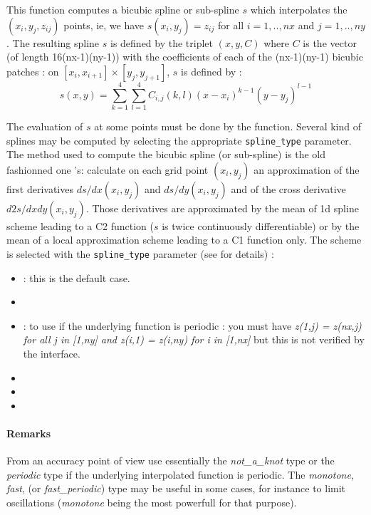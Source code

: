 \begin{mandescription}
    This function computes a bicubic spline or sub-spline $s$ which interpolates the 
    $(x_i,y_j,z_{ij})$ points, ie, we have $s(x_i,y_j)=z_{ij}$ for all  $i=1,..,nx$
    and $j=1,..,ny$. 
    The resulting spline $s$ is defined by the triplet $(x,y,C)$ where
    $C$ is the vector (of length 16(nx-1)(ny-1)) with the coefficients of each
    of the (nx-1)(ny-1) bicubic patches : on $[x_i, x_{i+1}] \times
    [y_j, y_{j+1}]$, $s$ is defined by :
    $$
       s(x,y) = \sum_{k=1}^4  \sum_{l=1}^4  C_{i,j}(k,l) (x - x_i)^{k-1}
       (y - y_j)^{l-1}
    $$

    The evaluation of  $s$ at some points must be done by the   
    function. Several kind of splines may be computed by selecting the appropriate 
    \verb!spline_type! parameter. The method used to compute the bicubic spline
    (or sub-spline) is the old fashionned one 's: calculate on each grid point
    $(x_i,y_j)$ an approximation of the first derivatives $ds/dx(x_i,y_j)$
    and $ds/dy(x_i,y_j)$ and of the cross derivative $d2s/dxdy(x_i,y_j)$.
    Those derivatives are approximated by the mean of 1d spline scheme leading to a C2
    function ($s$ is twice continuously differentiable) or by the mean of a
    local approximation scheme leading to a C1 function only. The scheme is selected
    with the \verb!spline_type! parameter (see   for details) :  
    
  \begin{itemize}

       \item {}: this is the default case.
       \item {} 
       \item {}: to use if the underlying function is periodic : you must have {\em z(1,j) = z(nx,j) for
              all j in [1,ny] and  z(i,1) = z(i,ny) for i in [1,nx]} but this is not verified
              by the interface.
       \item {} 
       \item {} 
       \item {}  
  \end{itemize}

  \end{mandescription}


  \paragraph{Remarks}
From an accuracy point of view use essentially the {\em not\_a\_knot} type or 
the {\em periodic} type if the underlying interpolated function is periodic.
The {\em monotone}, {\em fast},  (or {\em fast\_periodic}) type may
be useful in some cases, for instance to limit oscillations ({\em monotone} being the
most powerfull for that purpose).
    

